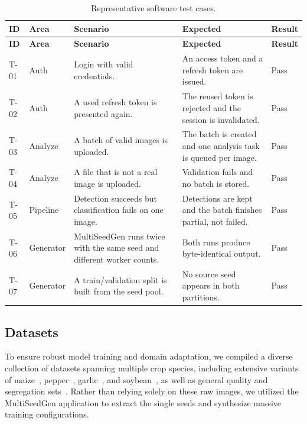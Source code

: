 \begin{singlespace}
\begin{longtable}{@{}p{}p{}p{}p{}p{}@{}}
\caption{Representative software test cases.}
\label{tab:ch6-cases}\\
\toprule
\textbf{ID} & \textbf{Area} & \textbf{Scenario} & \textbf{Expected} & \textbf{Result} \\
\midrule
\endfirsthead
\toprule
\textbf{ID} & \textbf{Area} & \textbf{Scenario} & \textbf{Expected} & \textbf{Result} \\
\midrule
\endhead
\bottomrule
\endfoot
T-01 & Auth & Login with valid credentials. & An access token and a refresh token are issued. & Pass \\
\addlinespace
T-02 & Auth & A used refresh token is presented again. & The reused token is rejected and the session is invalidated. & Pass \\
\addlinespace
T-03 & Analyze & A batch of valid images is uploaded. & The batch is created and one analysis task is queued per image. & Pass \\
\addlinespace
T-04 & Analyze & A file that is not a real image is uploaded. & Validation fails and no batch is stored. & Pass \\
\addlinespace
T-05 & Pipeline & Detection succeeds but classification fails on one image. & Detections are kept and the batch finishes partial, not failed. & Pass \\
\addlinespace
T-06 & Generator & MultiSeedGen runs twice with the same seed and different worker counts. & Both runs produce byte-identical output. & Pass \\
\addlinespace
T-07 & Generator & A train/validation split is built from the seed pool. & No source seed appears in both partitions. & Pass \\
\end{longtable}
\end{singlespace}

\subsection{Datasets}
\label{sec:ch6-datasets}

To ensure robust model training and domain adaptation, we compiled a diverse collection of datasets spanning multiple crop species, including extensive variants of maize~\cite{naagar2025corn, roboflow2025maize}, pepper~\cite{roboflow20Pepper}, garlic~\cite{roboflow20Garlic}, and soybean~\cite{kaggle20SoybeanClass, github20Soypr, kaggle20SoybeanHealthy}, as well as general quality and segregation sets~\cite{roboflow2025seedquality, mendeley20SeedQual, mendeley20SeedDecay, roboflow20Segregation}. Rather than relying solely on these raw images, we utilized the MultiSeedGen application to extract the single seeds and synthesize massive training configurations.


